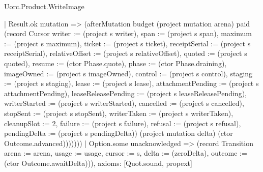 \begin{lexlean}{Uorc.Product.WriteImage}
\begin{semanticmodule}
{            | Result.ok mutation => (afterMutation budget (project mutation arena) paid (record Cursor {writer := (project s writer), span := (project s span), maximum := (project s maximum), ticket := (project s ticket), receiptSerial := (project s receiptSerial), relativeOffset := (project s relativeOffset), quoted := (project s quoted), resume := (ctor Phase.quote), phase := (ctor Phase.draining), imageOwned := (project s imageOwned), control := (project s control), staging := (project s staging), lease := (project s lease), attachmentPending := (project s attachmentPending), leaseReleasePending := (project s leaseReleasePending), writerStarted := (project s writerStarted), cancelled := (project s cancelled), stopSent := (project s stopSent), writerTaken := (project s writerTaken), cleanupSlot := 2, failure := (project s failure), refusal := (project s refusal), pendingDelta := (project s pendingDelta)}) (project mutation delta) (ctor Outcome.advanced)))))))
    | Option.some unacknowledged => (record Transition {arena := arena, usage := usage, cursor := s, delta := (zeroDelta), outcome := (ctor Outcome.awaitDelta)})),
  axioms: [Quot.sound, propext]
}


\end{semanticmodule}
\end{lexlean}
